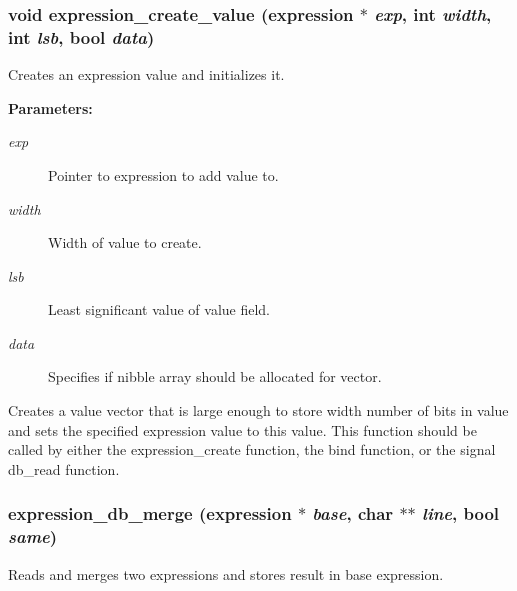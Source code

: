 \subsubsection{\setlength{\rightskip}{0pt plus 5cm}void expression\_\-create\_\-value ({\bf expression} $\ast$ {\em exp}, int {\em width}, int {\em lsb}, {\bf bool} {\em data})}\label{expr_8h_a0}


Creates an expression value and initializes it.

\begin{Desc}
\item[{\bf Parameters: }]\par
\begin{description}
\item[
{\em exp}]Pointer to expression to add value to. \item[
{\em width}]Width of value to create. \item[
{\em lsb}]Least significant value of value field. \item[
{\em data}]Specifies if nibble array should be allocated for vector.

\end{description}
\end{Desc}
Creates a value vector that is large enough to store width number of bits in value and sets the specified expression value to this value. This function should be called by either the expression\_\-create function, the bind function, or the signal db\_\-read function. 
\subsubsection{ expression\_\-db\_\-merge ({\bf expression} $\ast$ {\em base}, char $\ast$$\ast$ {\em line}, {\bf bool} {\em same})}\label{expr_8h_a7}


Reads and merges two expressions and stores result in base expression.

